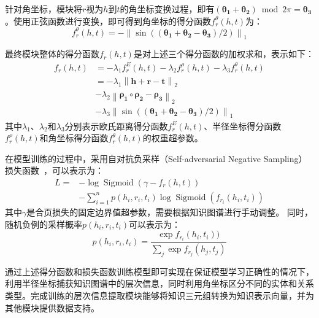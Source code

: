 \documentclass[algorithmlist, AutoFakeBold, AutoFakeSlant, figurelist, tablelist, nomlist, engineering]{seuthesix}
\begin{document}
针对角坐标，模块将$r$视为$h$到$t$的角坐标变换过程，即有$(\bm{\theta_1} + \bm{\theta_2}) \bmod 2 \pi = \bm{\theta_3}$。使用正弦函数进行变换，即可得到角坐标的得分函数$f^{\theta}_r(h, t)$为：
\begin{equation}
  f^{\theta}_r\left(h, t\right) =-\left\|\sin \left(\left(\bm{\theta_1}+\bm{\theta_2}-\bm{\theta_3}\right) / 2\right)\right\|_1
\end{equation}

最终模块整体的得分函数$f_r(h, t)$是对上述三个得分函数的加权求和，表示如下：
\begin{equation}
  \begin{aligned}
    f_r\left(h, t\right) &= -\lambda_1 f^{E}_r(h, t) -\lambda_2 f^{\rho}_r(h, t) -\lambda_3 f^{\theta}_r(h, t) \\
    &= -\lambda_1 \left\|\bm{h} + \bm{r} - \bm{t}\right\|_2 \\
    &-\lambda_2 \left\|\bm{\rho_1} \circ \bm{\rho_2} - \bm{\rho_3}\right\|_2 \\
    &-\lambda_3\left\|\sin \left(\left(\bm{\theta_1}+\bm{\theta_2}-\bm{\theta_3}\right) / 2\right)\right\|_1
  \end{aligned}
  \label{f_1}
\end{equation}
其中$\lambda_1$、$\lambda_2$和$\lambda_3$分别表示欧氏距离得分函数$f^E_r(h, t)$、半径坐标得分函数$f^{\rho}_r(h, t)$和角坐标得分函数$f^{\theta}_r(h, t)$的权重超参数。

在模型训练的过程中，采用自对抗负采样（Self-adversarial Negative Sampling）损失函数~\cite{sun2018rotate}，可以表示为：
\begin{equation}
  \begin{aligned}
  L= & -\log \operatorname{Sigmoid}\left(\gamma-f_r(h, t)\right) \\
  & -\sum_{i=1}^n p\left(h_i, r_i, t_i\right) \log \operatorname{Sigmoid}(f_{r_i}(h_i, t_i))
  \end{aligned}
  \label{loss_1}
\end{equation}
其中$\gamma$是合页损失的固定边界值超参数，需要根据知识图谱进行手动调整。
同时，随机负例的采样概率$p(h_i, r_i, t_i)$可以表示为：
\begin{equation}
  p(h_i, r_i, t_i)=\frac{\exp f_{r_i}(h_i, t_i))}{\sum_j \exp f_{r_j}(h_j, t_j)}
  \label{abc}
\end{equation}

通过上述得分函数和损失函数训练模型即可实现在保证模型学习正确性的情况下，利用半径坐标捕获知识图谱中的层次信息，同时利用角坐标区分不同的实体和关系类型。完成训练的层次信息提取模块能够将知识三元组转换为知识表示向量，并为其他模块提供数据支持。
\end{document}
